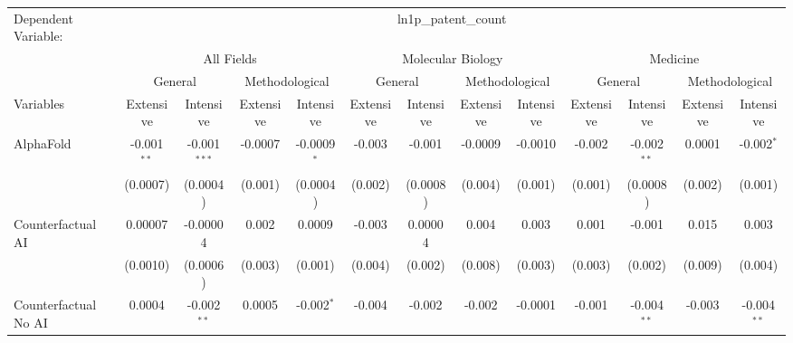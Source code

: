 \begingroup
\centering
\begin{tabular}{lcccccccccccc}
   \tabularnewline \midrule \midrule
   Dependent Variable: & \multicolumn{12}{c}{ln1p\_patent\_count}\\
 & \multicolumn{4}{c}{All Fields} & \multicolumn{4}{c}{Molecular Biology} & \multicolumn{4}{c}{Medicine} \\
\cmidrule(lr){2-5} \cmidrule(lr){6-9} \cmidrule(lr){10-13}
 & \multicolumn{2}{c}{General} & \multicolumn{2}{c}{Methodological} & \multicolumn{2}{c}{General} & \multicolumn{2}{c}{Methodological} & \multicolumn{2}{c}{General} & \multicolumn{2}{c}{Methodological} \\
\cmidrule(lr){2-3} \cmidrule(lr){4-5} \cmidrule(lr){6-7} \cmidrule(lr){8-9} \cmidrule(lr){10-11} \cmidrule(lr){12-13}
Variables & \multicolumn{1}{c}{Extensive} & \multicolumn{1}{c}{Intensive} & \multicolumn{1}{c}{Extensive} & \multicolumn{1}{c}{Intensive} & \multicolumn{1}{c}{Extensive} & \multicolumn{1}{c}{Intensive} & \multicolumn{1}{c}{Extensive} & \multicolumn{1}{c}{Intensive} & \multicolumn{1}{c}{Extensive} & \multicolumn{1}{c}{Intensive} & \multicolumn{1}{c}{Extensive} & \multicolumn{1}{c}{Intensive} \\
\cmidrule(lr){1-1}\cmidrule(lr){2-2} \cmidrule(lr){3-3} \cmidrule(lr){4-4} \cmidrule(lr){5-5} \cmidrule(lr){6-6} \cmidrule(lr){7-7} \cmidrule(lr){8-8} \cmidrule(lr){9-9} \cmidrule(lr){10-10} \cmidrule(lr){11-11} \cmidrule(lr){12-12} \cmidrule(lr){13-13}
   AlphaFold                                & -0.001$^{**}$ & -0.001$^{***}$ & -0.0007 & -0.0009$^{*}$ & -0.003  & -0.001   & -0.0009 & -0.0010  & -0.002  & -0.002$^{**}$ & 0.0001  & -0.002$^{*}$\\   
                                            & (0.0007)      & (0.0004)       & (0.001) & (0.0004)      & (0.002) & (0.0008) & (0.004) & (0.001)  & (0.001) & (0.0008)      & (0.002) & (0.001)\\   
   Counterfactual AI                        & 0.00007       & -0.00004       & 0.002   & 0.0009        & -0.003  & 0.00004  & 0.004   & 0.003    & 0.001   & -0.001        & 0.015   & 0.003\\   
                                            & (0.0010)      & (0.0006)       & (0.003) & (0.001)       & (0.004) & (0.002)  & (0.008) & (0.003)  & (0.003) & (0.002)       & (0.009) & (0.004)\\   
   Counterfactual No AI                     & 0.0004        & -0.002$^{**}$  & 0.0005  & -0.002$^{*}$  & -0.004  & -0.002   & -0.002  & -0.0001  & -0.001  & -0.004$^{**}$ & -0.003  & -0.004$^{**}$\\   

\end{tabular}
